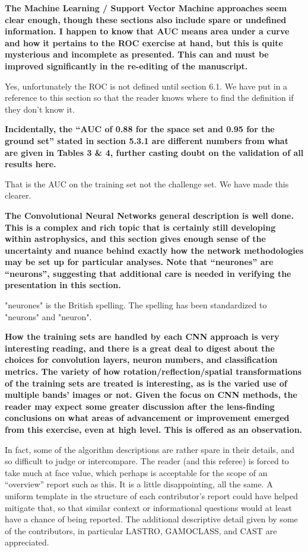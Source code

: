 \documentclass[11pt,a4paper]{article}
\begin{document}
{\bf
The Machine Learning / Support Vector Machine approaches seem clear enough, though these sections also include spare or undefined information.  I happen to know that AUC means area under a curve and how it pertains to the ROC exercise at hand, but this is quite mysterious and incomplete as presented. This can and must be improved significantly in the re-editing of the manuscript.}

Yes, unfortunately the ROC is not defined until section 6.1.  We have put in a reference to this section so that the reader knows where to find the definition if they don't know it.

{\bf Incidentally, the “AUC of 0.88 for the space set and 0.95 for the ground set” stated in section 5.3.1 are different numbers from what are given in Tables 3 \& 4, further casting doubt on the validation of all results here.  
}

That is the AUC on the training set not the challenge set.  We have made this clearer.

{\bf
The Convolutional Neural Networks general description is well done.  This is a complex and rich topic that is certainly still developing within astrophysics, and this section gives enough sense of the uncertainty and nuance behind exactly how the network methodologies may be set up for particular analyses.  Note that “neurones” are “neurons”, suggesting that additional care is needed in verifying the presentation in this section.   
}

"neurones" is the British spelling.  The spelling has been standardized to "neurons" and "neuron". 

{\bf
How the training sets are handled by each CNN approach is very interesting reading, and there is a great deal to digest about the choices for convolution layers, neuron numbers, and classification metrics.  The variety of how rotation/reflection/spatial transformations of the training sets are treated is interesting, as is the varied use of multiple bands’ images or not.  Given the focus on CNN methods, the reader may expect some greater discussion after the lens-finding conclusions on what areas of advancement or improvement emerged from this exercise, even at high level.   This is offered as an observation.  

In fact, some of the algorithm descriptions are rather spare in their details, and so difficult to judge or intercompare.  The reader (and this referee) is forced to take much at face value, which perhaps is acceptable for the scope of an “overview” report such as this.  It is a little disappointing, all the same.  A uniform template in the structure of each contributor’s report could have helped mitigate that, so that similar context or informational questions would at least have a chance of being reported.  The additional descriptive detail given by some of the contributors, in particular LASTRO, GAMOCLASS, and CAST are appreciated. 
}
\end{document}
